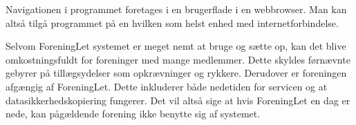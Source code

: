 Navigationen i programmet foretages i en brugerflade i en webbrowser. Man kan altså tilgå programmet på en hvilken som helst enhed med internetforbindelse. 


Selvom ForeningLet systemet er meget nemt at bruge og sætte op, kan det blive omkostningsfuldt for foreninger med mange medlemmer. Dette skyldes førnævnte gebyrer på tillægsydelser som opkrævninger og rykkere. Derudover er foreningen afgængig af ForeningLet. Dette inkluderer både nedetiden for servicen og at datasikkerhedskopiering fungerer. Det vil altså sige at hvis ForeningLet en dag er nede, kan pågældende forening ikke benytte sig af systemet.

